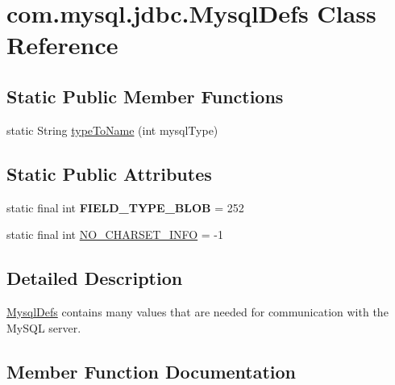 \hypertarget{classcom_1_1mysql_1_1jdbc_1_1_mysql_defs}{}\section{com.\+mysql.\+jdbc.\+Mysql\+Defs Class Reference}
\label{classcom_1_1mysql_1_1jdbc_1_1_mysql_defs}
\subsection*{Static Public Member Functions}
\begin{DoxyCompactItemize}
\item 
static String \mbox{\hyperlink{classcom_1_1mysql_1_1jdbc_1_1_mysql_defs_a917df4c02b52c3ec23008f9d4bf6d265}{type\+To\+Name}} (int mysql\+Type)
\end{DoxyCompactItemize}
\subsection*{Static Public Attributes}
\begin{DoxyCompactItemize}
\item 
\mbox{\label{classcom_1_1mysql_1_1jdbc_1_1_mysql_defs_a7df76d1fcc1d73fd96c0cfb19d94ee5c}} 
static final int {\bfseries F\+I\+E\+L\+D\+\_\+\+T\+Y\+P\+E\+\_\+\+B\+L\+OB} = 252
\item 
static final int \mbox{\hyperlink{classcom_1_1mysql_1_1jdbc_1_1_mysql_defs_a57ecf71e2bc25b5a02f82e1c55d6c3d0}{N\+O\+\_\+\+C\+H\+A\+R\+S\+E\+T\+\_\+\+I\+N\+FO}} = -\/1
\end{DoxyCompactItemize}


\subsection{Detailed Description}
\mbox{\hyperlink{classcom_1_1mysql_1_1jdbc_1_1_mysql_defs}{Mysql\+Defs}} contains many values that are needed for communication with the My\+S\+QL server. 

\subsection{Member Function Documentation}
\mbox{\label{classcom_1_1mysql_1_1jdbc_1_1_mysql_defs_a917df4c02b52c3ec23008f9d4bf6d265}} 

